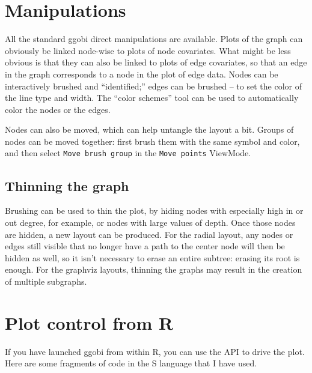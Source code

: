 \documentclass[11pt]{article}
\begin{document}
\section{Manipulations}

All the standard ggobi direct manipulations are available.  Plots of
the graph can obviously be linked node-wise to plots of node covariates.
What might be less obvious is that they can also be linked to plots of
edge covariates, so that an edge in the graph corresponds to a node in the
plot of edge data.  Nodes can be interactively brushed and ``identified;''
edges can be brushed -- to set the color of the line type and width.
The ``color schemes'' tool can be used to automatically color the nodes
or the edges.

Nodes can also be moved, which can help untangle the layout a bit.
Groups of nodes can be moved together: first brush them with
the same symbol and color, and then select {\tt Move brush group}
in the {\tt Move points} ViewMode.


\subsection{Thinning the graph}

Brushing can be used to thin the plot, by hiding nodes with especially
high in or out degree, for example, or nodes with large values of depth.
Once those nodes are hidden, a new layout can be produced.
For the radial layout, any nodes or edges still visible that no longer
have a path to the center node will then be hidden as well, so it isn't
necessary to erase an entire subtree: erasing its root is enough.
For the graphviz layouts, thinning the graphs may result in the
creation of multiple subgraphs.

\section{Plot control from R}

If you have launched ggobi from within R, you can use the API to
drive the plot.  Here are some fragments of code in the S language
that I have used.
\end{document}
